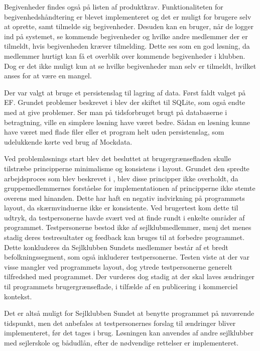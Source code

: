 Begivenheder findes også på listen af produktkrav.
Funktionaliteten for begivenhedshåndtering er blevet implementeret og det er muligt for brugere selv at oprette, samt tilmelde sig begivenheder.
Desuden kan en bruger, når de logger ind på systemet, se kommende begivenheder og hvilke andre medlemmer der er tilmeldt, hvis begivenheden kræver tilmelding. 
Dette ses som en god løsning, da medlemmer hurtigt kan få et overblik over kommende begivenheder i klubben.
Dog er det ikke muligt kun at se hvilke begivenheder man selv er tilmeldt, hvilket anses for at være en mangel. 

Der var valgt at bruge et persistenslag til lagring af data. 
Først faldt valget på \acl{EF}. 
Grundet problemer beskrevet i  blev der skiftet til SQLite, som også endte med at give problemer. 
Ser man på tidsforbruget brugt på databaserne i betragtning, ville en simplere løsning have været bedre.
Sådan en løsning kunne have været med flade filer eller et program helt uden persistenslag, som udelukkende kørte ved brug af Mockdata.  

Ved problemløsnings start blev det besluttet at brugergrænsefladen skulle tilstræbe principperne minimalisme og konsistens i layout.
Grundet den spredte arbejdsproces som blev beskrevet i , blev disse principper ikke overholdt, da gruppemedlemmernes forståelse for implementationen af principperne ikke stemte overens med hinanden.
Dette har haft en negativ indvirkning på programmets layout, da skærmvinduerne ikke er konsistente.
Ved brugertest kom dette til udtryk, da testpersonerne havde svært ved at finde rundt i enkelte områder af programmet.
Testpersonerne bestod ikke af sejlklubmedlemmer, menj det menes stadig deres testresultater og feedback kan bruges til at forbedre programmet.
Dette konkluderes da Sejlklubben Sundets medlemmer består af et bredt befolkningssegment, som også inkluderer testpersonerne.
Testen viste at der var visse mangler ved programmets layout, dog ytrede testpersonerne generelt tilfredshed med programmet.
Der vurderes dog stadig at der skal laves ændringer til programmets brugergrænseflade, i tilfælde af en publicering i kommerciel kontekst. 

Det er altså muligt for Sejlklubben Sundet at benytte programmet på nuværende tidspunkt, men det anbefales at testpersonernes forslag til ændringer bliver implementeret, før det tages i brug.
Løsningen kan anvendes af andre sejlklubber med sejlerskole og bådudlån, efter de nødvendige rettelser er implementeret.

